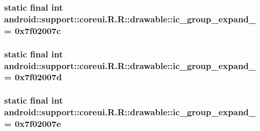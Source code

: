 \hypertarget{classandroid_1_1support_1_1coreui_1_1_r_1_1drawable_e9791a05180c2ef79f824c41b28d0317}{
\subsubsection[{ic\_\-group\_\-expand\_\-13}]{\setlength{\rightskip}{0pt plus 5cm}static final int android::support::coreui.R.R::drawable::ic\_\-group\_\-expand\_ = 0x7f02007c}}
\label{classandroid_1_1support_1_1coreui_1_1_r_1_1drawable_e9791a05180c2ef79f824c41b28d0317}


\hypertarget{classandroid_1_1support_1_1coreui_1_1_r_1_1drawable_5319a72d99c21416b935210963eda165}{
\subsubsection[{ic\_\-group\_\-expand\_\-14}]{\setlength{\rightskip}{0pt plus 5cm}static final int android::support::coreui.R.R::drawable::ic\_\-group\_\-expand\_ = 0x7f02007d}}
\label{classandroid_1_1support_1_1coreui_1_1_r_1_1drawable_5319a72d99c21416b935210963eda165}


\hypertarget{classandroid_1_1support_1_1coreui_1_1_r_1_1drawable_1180588bb6aa209f72e42ff55ceec2be}{
\subsubsection[{ic\_\-group\_\-expand\_\-15}]{\setlength{\rightskip}{0pt plus 5cm}static final int android::support::coreui.R.R::drawable::ic\_\-group\_\-expand\_ = 0x7f02007e}}
\label{classandroid_1_1support_1_1coreui_1_1_r_1_1drawable_1180588bb6aa209f72e42ff55ceec2be}


